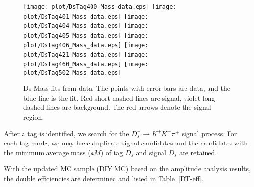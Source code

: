\begin{figure*}[!htbp]
 \centering
 \texttt{[image: plot/DsTag400\_Mass\_data.eps]}
 \texttt{[image: plot/DsTag401\_Mass\_data.eps]}
 \texttt{[image: plot/DsTag404\_Mass\_data.eps]}
 \texttt{[image: plot/DsTag405\_Mass\_data.eps]}
 \texttt{[image: plot/DsTag406\_Mass\_data.eps]}
 \texttt{[image: plot/DsTag421\_Mass\_data.eps]}
 \texttt{[image: plot/DsTag460\_Mass\_data.eps]}
 \texttt{[image: plot/DsTag502\_Mass\_data.eps]}
 \caption{Ds Mass fits from data. The points with error bars are data, and the blue line is the fit. Red short-dashed lines are signal, violet long-dashed lines are background. The red arrows denote the signal region.  }
\label{SingleTagFit}
\end{figure*}


After a tag is identified, we search for the $D_{s}^{+} \rightarrow K^{+}K^{-}\pi^{+}$ signal process. 
For each tag mode, we may have duplicate signal candidates and the candidates with the minimum average mass ($aM$) of tag $D_{s}$ and signal $D_{s}$ are retained.


With the updated MC sample (DIY MC) based on the amplitude analysis results, the double efficiencies are determined and listed in Table~\ref{DT-eff}.

